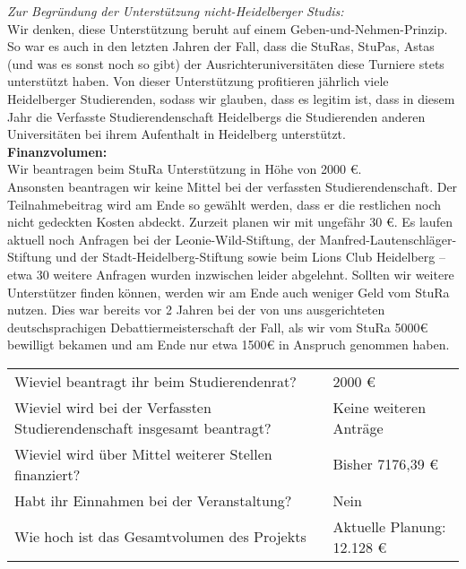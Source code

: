 {    \emph{Zur Begründung der Unterstützung nicht-Heidelberger Studis:}\\
    Wir denken, diese Unterstützung beruht auf einem Geben-und-Nehmen-Prinzip. So war es auch in den letzten Jahren der Fall, dass die StuRas, StuPas, Astas (und was es sonst noch so gibt) der Ausrichteruniversitäten diese Turniere stets unterstützt haben. Von dieser Unterstützung profitieren jährlich viele Heidelberger Studierenden, sodass wir glauben, dass es legitim ist, dass in diesem Jahr die Verfasste Studierendenschaft Heidelbergs die Studierenden anderen Universitäten bei ihrem Aufenthalt in Heidelberg unterstützt.\\[1em]
    \textbf{Finanzvolumen:}\\
    Wir beantragen beim StuRa Unterstützung in Höhe von 2000 €.\\[1em]
    Ansonsten beantragen wir keine Mittel bei der verfassten Studierendenschaft. Der Teilnahmebeitrag wird am Ende so gewählt werden, dass er die restlichen noch nicht gedeckten Kosten abdeckt. Zurzeit planen wir mit ungefähr 30 €. Es laufen aktuell noch Anfragen bei der Leonie-Wild-Stiftung, der Manfred-Lautenschläger-Stiftung und der Stadt-Heidelberg-Stiftung sowie beim Lions Club Heidelberg – etwa 30 weitere Anfragen wurden inzwischen leider abgelehnt. Sollten wir weitere Unterstützer finden können, werden wir am Ende auch weniger Geld vom StuRa nutzen. Dies war bereits vor 2 Jahren bei der von uns ausgerichteten deutschsprachigen Debattiermeisterschaft der Fall, als wir vom StuRa 5000€ bewilligt bekamen und am Ende nur etwa 1500€ in Anspruch genommen haben.\\[1em]
    \begin{tabular}{l l}
        Wieviel beantragt ihr beim Studierendenrat?                             & 2000 €                     \\
        Wieviel wird bei der Verfassten Studierendenschaft insgesamt beantragt? & Keine weiteren Anträge    \\
        Wieviel wird über Mittel weiterer Stellen finanziert?                   & Bisher 7176,39 €           \\
        Habt ihr Einnahmen bei der Veranstaltung?                               & Nein                      \\
        Wie hoch ist das Gesamtvolumen des Projekts                             & Aktuelle Planung: 12.128 € \\
    \end{tabular}
    \newline
}
